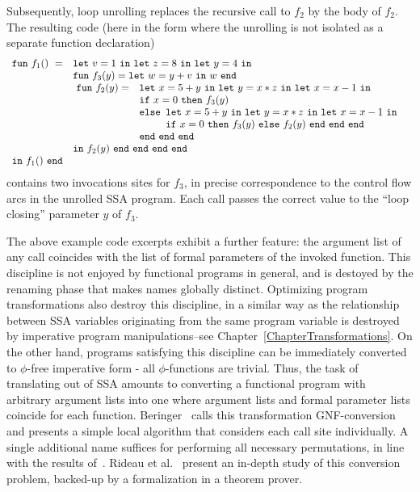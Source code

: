 Subsequently, loop unrolling replaces the recursive
call to $f_2$ by the body of $f_2$. The resulting code (here in the
form where the unrolling is not isolated as a separate function
declaration) 
$$
\begin{array}{ll}
\mathtt{fun}\ f_1()\ = & \mathtt{let}\ v = 1 \ 
                  \mathtt{in\ let}\ z = 8 \ 
                  \mathtt{in\ let}\ y = 4\ \mathtt{in}\\
& \mathtt{fun}\ f_3(y) = 
   \mathtt{let}\ w = y+v\ \mathtt{in}\ w\ \mathtt{end}\\
&\! \begin{array}{ll}
     \mathtt{fun}\ f_2(y) = &
     \mathtt{let}\ x = 5+y\
     \mathtt{in\ let}\ y = x*z\
     \mathtt{in\ let}\ x = x-1\ \mathtt{in}\\
   & \mathtt{if}\ x=0\ \mathtt{then}\ f_3(y)\\
   & \mathtt{else} 
       \begin{array}[t]{l} 
         \mathtt{let}\ x = 5+y\
         \mathtt{in\ let}\ y = x*z\
         \mathtt{in\ let}\ x = x-1\ \mathtt{in}\\
         \mathtt{if}\ x=0\ \mathtt{then}\ f_3(y)\
         \mathtt{else}\ f_2(y)\ \mathtt{end\ end\ end}
       \end{array}\\ 
   & \mathtt{end\ end\ end}
  \end{array}\\
& \mathtt{in}\ f_2(y)\ \mathtt{end\ end\ end\ end}\\
\mathtt{in}\ f_1()\  \mathtt{end}
\end{array}
$$ 
contains two invocations sites for $f_3$, in precise correspondence to
the control flow arcs in the unrolled SSA program. Each call passes
the correct value to the ``loop closing'' parameter $y$ of $f_3$.

The above example code excerpts exhibit a further feature: the
argument list of any call coincides with the list of formal parameters
of the invoked function. This discipline is not enjoyed by functional
programs in general, and is destoyed by the renaming phase that makes
names globally distinct. Optimizing program transformations also
destroy this discipline, in a similar way as the relationship between
SSA variables originating from the same program variable is destroyed
by imperative program manipulations--see
Chapter~\ref{ChapterTransformations}. On the other hand, programs
satisfying this discipline can be immediately converted to $\phi$-free
imperative form - all $\phi$-functions are trivial. Thus, the task of
translating out of SSA amounts to converting a functional program with
arbitrary argument lists into one where argument lists and formal
parameter lists coincide for each
function. Beringer~\cite{DBLP:journals/entcs/Beringer07} calls this
transformation GNF-conversion and presents a simple local algorithm
that considers each call site individually. A single additional name
suffices for performing all necessary permutations, in line with the
results of~\cite{May}. Rideau et
al.~\cite{DBLP:journals/jar/RideauSL08} present an in-depth study of
this conversion problem, backed-up by a formalization in a theorem
prover.

